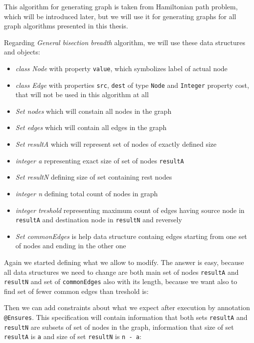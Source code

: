 \documentclass[11pt,twoside,a4paper]{book}
\begin{document}
This algorithm for generating graph is taken from Hamiltonian path problem,
which will be introduced later, but we will use it for generating graphs for all
graph algorithms presented in this thesis.

Regarding \textit{General bisection breadth} algorithm, we will use these data
structures and objects:

\begin{itemize}
  \item \textit{class Node} with property \verb|value|, which symbolizes label
  of actual node
  \item \textit{class Edge} with properties \verb|src|, \verb|dest| of type
  \verb|Node| and \verb|Integer| property cost, that will not be used in this
  algorithm at all
  \item \textit{Set nodes} which will constain all nodes in the graph
  \item \textit{Set edges} which will contain all edges in the graph
  \item \textit{Set resultA} which will represent set of nodes of exactly
  defined size
  \item \textit{integer a} representing exact size of set of nodes
  \verb|resultA|
  \item \textit{Set resultN} defining size of set containing rest nodes
  \item \textit{integer n} defining total count of nodes in graph 
  \item \textit{integer treshold} representing maximum
  count of edges having source node in \verb|resultA| and destination node in \verb|resultN| and
  reversely
  \item \textit{Set commonEdges} is help data structure containg edges starting
  from one set of nodes and ending in the other one
\end{itemize}

Again we started defining what we allow to modify. The answer is easy, because
all data structures we need to change are both main set of nodes \verb|resultA|
and \verb|resultN| and set of \verb|commonEdges| also with its length, because
we want also to find set of fewer common edges than treshold is:




Then we can add constraints about what we expect after execution by annotation
\verb|@Ensures|. This specification will contain information that both sets
\verb|resultA| and \verb|resultN| are subsets of set of nodes in the graph,
information that size of set \verb|resultA| is \verb|a| and size of set
\verb|resultN| is \verb|n - a|:
\newpage

\end{document}
